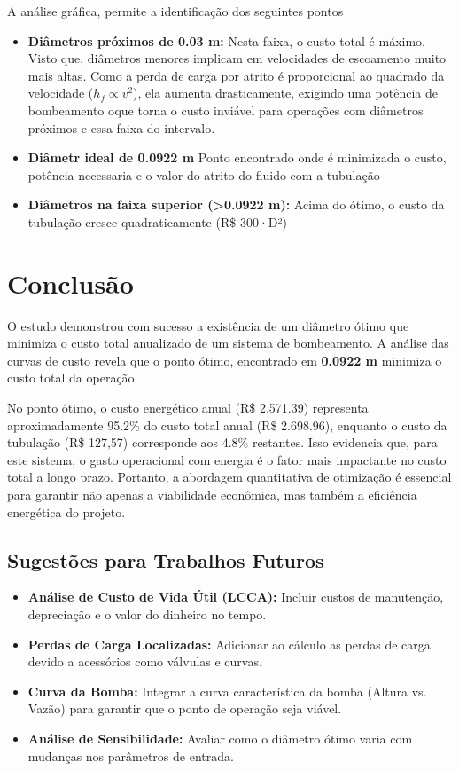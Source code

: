 \documentclass[12pt, a4paper]{article}
\begin{document}
            A análise gráfica, permite a identificação dos seguintes pontos
            \begin{itemize}
                \item \textbf{Diâmetros próximos de 0.03 m:} Nesta faixa, o custo total é máximo. Visto que, diâmetros menores implicam em velocidades de escoamento muito mais altas. Como a perda de carga por atrito é proporcional ao quadrado da velocidade ($h_f \propto v^2$), ela aumenta drasticamente, exigindo uma potência de bombeamento oque torna o custo inviável para operações com diâmetros próximos e essa faixa do intervalo.
                \item \textbf{Diâmetr ideal de 0.0922 m} Ponto encontrado onde é minimizada o custo, potência necessaria e o valor do atrito do fluido com a tubulação
                \item \textbf{Diâmetros na faixa superior (>0.0922 m):}  Acima do ótimo, o custo da tubulação cresce quadraticamente (R\$ 300·D²)
            \end{itemize}

    \section{Conclusão}
        O estudo demonstrou com sucesso a existência de um diâmetro ótimo que minimiza o custo total anualizado de um sistema de bombeamento. A análise das curvas de custo revela que o ponto ótimo, encontrado em \textbf{0.0922 m} minimiza o custo total da operação.

        No ponto ótimo, o custo energético anual (R\$ 2.571.39) representa aproximadamente 95.2\% do custo total anual (R\$ 2.698.96), enquanto o custo da tubulação (R\$ 127,57) corresponde aos 4.8\% restantes. Isso evidencia que, para este sistema, o gasto operacional com energia é o fator mais impactante no custo total a longo prazo. Portanto, a abordagem quantitativa de otimização é essencial para garantir não apenas a viabilidade econômica, mas também a eficiência energética do projeto.


        \subsection*{Sugestões para Trabalhos Futuros}
            \begin{itemize}
                \item \textbf{Análise de Custo de Vida Útil (LCCA):} Incluir custos de manutenção, depreciação e o valor do dinheiro no tempo.
                \item \textbf{Perdas de Carga Localizadas:} Adicionar ao cálculo as perdas de carga devido a acessórios como válvulas e curvas.
                \item \textbf{Curva da Bomba:} Integrar a curva característica da bomba (Altura vs. Vazão) para garantir que o ponto de operação seja viável.
                \item \textbf{Análise de Sensibilidade:} Avaliar como o diâmetro ótimo varia com mudanças nos parâmetros de entrada.
            \end{itemize}
    
\end{document}
